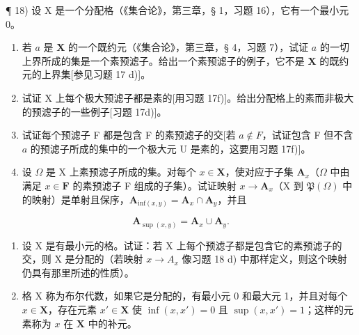 ¶ 18) 设 X 是一个分配格（《集合论》，第三章，§ 1，习题 16），它有一个最小元 0。

\begin{enumerate}
\def\labelenumi{\alph{enumi})}
\item
  若 \(a\) 是 \(\mathbf{X}\) 的一个既约元（《集合论》，第三章，§ 4，习题 7），试证 \(a\) 的一切上界所成的集是一个素预滤子。给出一个素预滤子的例子，它不是 \(\mathbf{X}\) 的既约元的上界集{[}参见习题 17 d){]}。
\item
  试证 X 上每个极大预滤子都是素的{[}用习题 17f){]}。给出分配格上的素而非极大的预滤子的一些例子{[}习题 17d){]}。
\item
  试证每个预滤子 F 都是包含 F 的素预滤子的交{[}若 \(a \notin F\)，试证包含 F 但不含 \(a\) 的预滤子所成的集中的一个极大元 U 是素的，这要用习题 17f){]}。
\item
  设 \(\Omega\) 是 X 上素预滤子所成的集。对每个 \(x \in \mathbf{X}\)，使对应于子集 \(\mathbf{A}_x\)（\(\Omega\) 中由满足 \(x \in \mathbf{F}\) 的素预滤子 F 组成的子集）。试证映射 \(x \to \mathbf{A}_x\)（X 到 \(\mathfrak{P}(\Omega)\) 中的映射）是单射且保序，\(\mathbf{A}_{\mathrm{inf}(x,y)} = \mathbf{A}_x \cap \mathbf{A}_y\)，并且
\end{enumerate}

\[
\mathbf {A} _ {\sup (x, y)} = \mathbf {A} _ {x} \cup \mathbf {A} _ {y}.
\]

\begin{enumerate}
\def\labelenumi{\arabic{enumi})}
\setcounter{enumi}{18}
\item
  设 X 是有最小元的格。试证：若 X 上每个预滤子都是包含它的素预滤子的交，则 X 是分配的（若映射 \(x \rightarrow A_{x}\) 像习题 18 d) 中那样定义，则这个映射仍具有那里所述的性质）。
\item
  格 X 称为布尔代数，如果它是分配的，有最小元 0 和最大元 1，并且对每个 \(x \in \mathbf{X}\)，存在元素 \(x' \in \mathbf{X}\) 使 \(\inf (x, x') = 0\) 且 \(\sup (x, x') = 1\)；这样的元素称为 \(x\) 在 \(\mathbf{X}\) 中的补元。
\end{enumerate}

